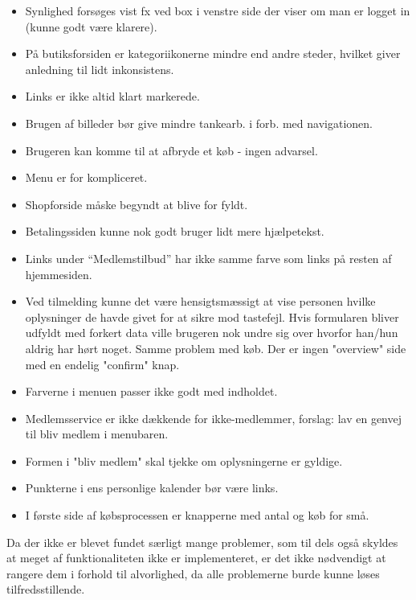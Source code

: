 \begin{itemize}
\item Synlighed forsøges vist fx ved box i venstre side der viser om man er logget in (kunne godt være klarere).
\item På butiksforsiden er kategoriikonerne mindre end andre steder, hvilket giver anledning til lidt inkonsistens.
\item Links er ikke altid klart markerede.
\item Brugen af billeder bør give mindre tankearb. i forb. med navigationen.
\item Brugeren kan komme til at afbryde et køb - ingen advarsel.
\item Menu er for kompliceret.
\item Shopforside måske begyndt at blive for fyldt.
\item Betalingssiden kunne nok godt bruger lidt mere hjælpetekst.
\item Links under ``Medlemstilbud'' har ikke samme farve som links på resten af hjemmesiden.
\item Ved tilmelding kunne det være hensigtsmæssigt at vise personen hvilke oplysninger de havde givet for at sikre mod tastefejl. Hvis formularen bliver udfyldt med forkert data ville brugeren nok undre sig over hvorfor han/hun aldrig har hørt noget. Samme problem med køb. Der er ingen "overview" side med en endelig "confirm" knap.
\item Farverne i menuen passer ikke godt med indholdet.
\item Medlemsservice er ikke dækkende for ikke-medlemmer, forslag: lav en genvej til bliv medlem i menubaren.
\item Formen i "bliv medlem" skal tjekke om oplysningerne er gyldige.
\item Punkterne i ens personlige kalender bør være links.
\item I første side af købsprocessen er knapperne med antal og køb for små.
\end{itemize}

Da der ikke er blevet fundet særligt mange problemer, som til dels også skyldes at meget af funktionaliteten ikke er implementeret, er det ikke nødvendigt at rangere
dem i forhold til alvorlighed, da alle problemerne burde kunne løses tilfredsstillende. 
